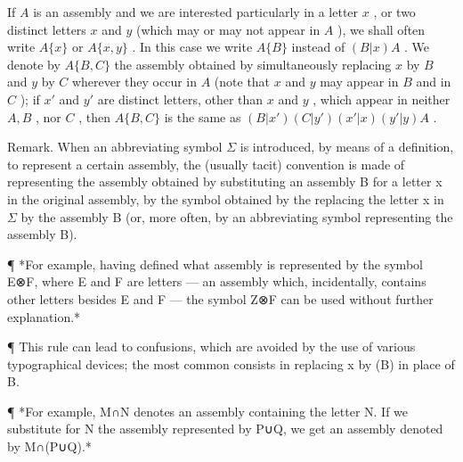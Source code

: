 If \(A\) is an assembly and we are interested particularly in a letter \(x\) , or two distinct letters \(x\) and \(y\) (which may or may not appear in \(A\) ), we shall often write \(A \{x\}\) or \(A \{x, y\}\) . In this case we write \(A \{B\}\) instead of \((B|x)A\) . We denote by \(A \{B, C\}\) the assembly obtained by simultaneously replacing \(x\) by \(B\) and \(y\) by \(C\) wherever they occur in \(A\) (note that \(x\) and \(y\) may appear in \(B\) and in \(C\) ); if \(x'\) and \(y'\) are distinct letters, other than \(x\) and \(y\) , which appear in neither \(A, B\) , nor \(C\) , then \(A \{B, C\}\) is the same as \((B|x') (C|y') (x'|x) (y'|y)A\) .

Remark. When an abbreviating symbol \(\Sigma\) is introduced, by means of a definition, to represent a certain assembly, the (usually tacit) convention is made of representing the assembly obtained by substituting an assembly B for a letter x in the original assembly, by the symbol obtained by the replacing the letter x in \(\Sigma\) by the assembly B (or, more often, by an abbreviating symbol representing the assembly B).

¶ *For example, having defined what assembly is represented by the symbol E⊗F, where E and F are letters --- an assembly which, incidentally, contains other letters besides E and F --- the symbol Z⊗F can be used without further explanation.*

¶ This rule can lead to confusions, which are avoided by the use of various typographical devices; the most common consists in replacing x by (B) in place of B.

¶ *For example, M∩N denotes an assembly containing the letter N. If we substitute for N the assembly represented by P∪Q, we get an assembly denoted by M∩(P∪Q).*

